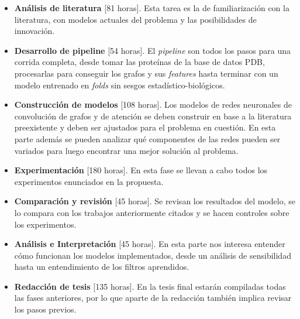 \documentclass[
    left=2.0cm,         %
    right=2.0cm,        %
    top=2.0cm,          %
    bottom=2.5cm,         %
    bindingoffset=6mm,  %
    nohyphenation=false %
]{eiti/eiti-thesis}
\begin{document}
\begin{itemize}
 \renewcommand{\labelitemi}{\scriptsize$\blacksquare$}
 \item  \textbf{Análisis de literatura} [81 horas]. Esta tarea es la de familiarización con la literatura, con
 modelos actuales del problema y las posibilidades de innovación.
 \item  \textbf{Desarrollo de pipeline} [54 horas]. El \textit{pipeline} son todos los
 pasos para una corrida completa, desde tomar las proteínas de la base de datos PDB,
 procesarlas para conseguir los grafos y sus \textit{features} hasta terminar con
 un modelo entrenado en \textit{folds} sin sesgos estadístico-biológicos.
 \item  \textbf{Construcción de modelos} [108 horas].   Los modelos de redes
 neuronales de convolución de grafos y de atención se deben construir en base a la
 literatura preexistente y deben ser ajustados para el problema en cuestión. En 
 esta parte además se pueden analizar qué componentes de las redes pueden ser variados
 para luego encontrar una mejor solución al problema.
 \item  \textbf{Experimentación} [180 horas]. En esta fase se llevan a cabo
 todos los experimentos enunciados en la propuesta.
 \item  \textbf{Comparación y revisión} [45 horas]. Se revisan los resultados del modelo,
 se lo compara con los trabajos anteriormente citados y se hacen controles sobre
 los experimentos.
 \item  \textbf{Análisis e Interpretación} [45 horas]. En esta parte nos interesa
 entender cómo funcionan los modelos implementados, desde un análisis de sensibilidad
 hasta un entendimiento de los filtros aprendidos.
 \item  \textbf{Redacción de tesis} [135 horas]. En la tesis final estarán compiladas
 todas las fases anteriores, por lo que aparte de la redacción también implica revisar
 los pasos previos.
\end{itemize}



\newpage
\printbibliography

\newpage

\vspace{1cm}                %
\end{document}
